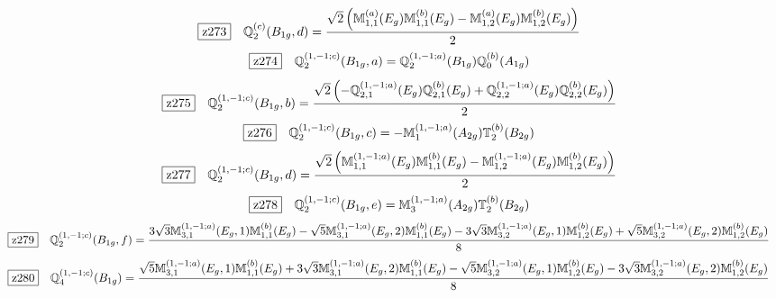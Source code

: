 \documentclass[fleqn,10pt,landscape]{jsarticle}
\begin{document}
\begin{dmath*}
\hspace*{3mm}\fbox{z273}\quad \mathbb{Q}_{2}^{(c)}(B_{1g},d)=\frac{\sqrt{2} \left(\mathbb{M}_{1,1}^{(a)}(E_{g}) \mathbb{M}_{1,1}^{(b)}(E_{g}) - \mathbb{M}_{1,2}^{(a)}(E_{g}) \mathbb{M}_{1,2}^{(b)}(E_{g})\right)}{2}
\end{dmath*}
\begin{dmath*}
\hspace*{3mm}\fbox{z274}\quad \mathbb{Q}_{2}^{(1,-1;c)}(B_{1g},a)=\mathbb{Q}_{2}^{(1,-1;a)}(B_{1g}) \mathbb{Q}_{0}^{(b)}(A_{1g})
\end{dmath*}
\begin{dmath*}
\hspace*{3mm}\fbox{z275}\quad \mathbb{Q}_{2}^{(1,-1;c)}(B_{1g},b)=\frac{\sqrt{2} \left(- \mathbb{Q}_{2,1}^{(1,-1;a)}(E_{g}) \mathbb{Q}_{2,1}^{(b)}(E_{g}) + \mathbb{Q}_{2,2}^{(1,-1;a)}(E_{g}) \mathbb{Q}_{2,2}^{(b)}(E_{g})\right)}{2}
\end{dmath*}
\begin{dmath*}
\hspace*{3mm}\fbox{z276}\quad \mathbb{Q}_{2}^{(1,-1;c)}(B_{1g},c)=- \mathbb{M}_{1}^{(1,-1;a)}(A_{2g}) \mathbb{T}_{2}^{(b)}(B_{2g})
\end{dmath*}
\begin{dmath*}
\hspace*{3mm}\fbox{z277}\quad \mathbb{Q}_{2}^{(1,-1;c)}(B_{1g},d)=\frac{\sqrt{2} \left(\mathbb{M}_{1,1}^{(1,-1;a)}(E_{g}) \mathbb{M}_{1,1}^{(b)}(E_{g}) - \mathbb{M}_{1,2}^{(1,-1;a)}(E_{g}) \mathbb{M}_{1,2}^{(b)}(E_{g})\right)}{2}
\end{dmath*}
\begin{dmath*}
\hspace*{3mm}\fbox{z278}\quad \mathbb{Q}_{2}^{(1,-1;c)}(B_{1g},e)=\mathbb{M}_{3}^{(1,-1;a)}(A_{2g}) \mathbb{T}_{2}^{(b)}(B_{2g})
\end{dmath*}
\begin{dmath*}
\hspace*{3mm}\fbox{z279}\quad \mathbb{Q}_{2}^{(1,-1;c)}(B_{1g},f)=\frac{3 \sqrt{3} \mathbb{M}_{3,1}^{(1,-1;a)}(E_{g},1) \mathbb{M}_{1,1}^{(b)}(E_{g}) - \sqrt{5} \mathbb{M}_{3,1}^{(1,-1;a)}(E_{g},2) \mathbb{M}_{1,1}^{(b)}(E_{g}) - 3 \sqrt{3} \mathbb{M}_{3,2}^{(1,-1;a)}(E_{g},1) \mathbb{M}_{1,2}^{(b)}(E_{g}) + \sqrt{5} \mathbb{M}_{3,2}^{(1,-1;a)}(E_{g},2) \mathbb{M}_{1,2}^{(b)}(E_{g})}{8}
\end{dmath*}
\begin{dmath*}
\hspace*{3mm}\fbox{z280}\quad \mathbb{Q}_{4}^{(1,-1;c)}(B_{1g})=\frac{\sqrt{5} \mathbb{M}_{3,1}^{(1,-1;a)}(E_{g},1) \mathbb{M}_{1,1}^{(b)}(E_{g}) + 3 \sqrt{3} \mathbb{M}_{3,1}^{(1,-1;a)}(E_{g},2) \mathbb{M}_{1,1}^{(b)}(E_{g}) - \sqrt{5} \mathbb{M}_{3,2}^{(1,-1;a)}(E_{g},1) \mathbb{M}_{1,2}^{(b)}(E_{g}) - 3 \sqrt{3} \mathbb{M}_{3,2}^{(1,-1;a)}(E_{g},2) \mathbb{M}_{1,2}^{(b)}(E_{g})}{8}
\end{dmath*}
\end{document}
